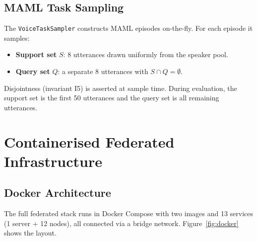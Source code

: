 \documentclass[12pt]{article}
\theoremstyle{plain}
\begin{document}
\subsection{MAML Task Sampling}

The \verb|VoiceTaskSampler| constructs MAML episodes on-the-fly.
For each episode it samples:

\begin{itemize}
  \item \textbf{Support set} $S$: 8 utterances drawn uniformly from the speaker pool.
  \item \textbf{Query set} $Q$: a separate 8 utterances with $S \cap Q = \emptyset$.
\end{itemize}

Disjointness (invariant I5) is asserted at sample time.
During evaluation, the support set is the first 50 utterances and the query set
is all remaining utterances.

\section{Containerised Federated Infrastructure}
\label{sec:infra}

\subsection{Docker Architecture}

The full federated stack runs in Docker Compose with two images and
13 services (1 server + 12 nodes), all connected via a bridge network.
Figure~\ref{fig:docker} shows the layout.
\end{document}
